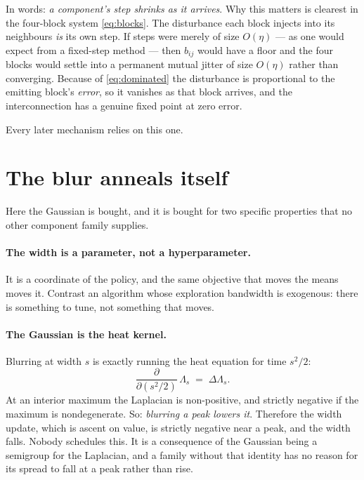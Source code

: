 \documentclass[11pt]{article}
\theoremstyle{definition}
\begin{document}
In words: \emph{a component's step shrinks as it arrives}. Why this matters is
clearest in the four-block system \eqref{eq:blocks}. The disturbance each block
injects into its neighbours \emph{is} its own step. If steps were merely of size
$O(\eta)$ --- as one would expect from a fixed-step method --- then $b_{ij}$ would
have a floor and the four blocks would settle into a permanent mutual jitter of
size $O(\eta)$ rather than converging. Because of \eqref{eq:dominated} the
disturbance is proportional to the emitting block's \emph{error}, so it vanishes
as that block arrives, and the interconnection has a genuine fixed point at zero
error.

Every later mechanism relies on this one.

\section{The blur anneals itself}\label{sec:anneal}

Here the Gaussian is bought, and it is bought for two specific properties that no
other component family supplies.

\paragraph{The width is a parameter, not a hyperparameter.} It is a coordinate of
the policy, and the same objective that moves the means moves it. Contrast an
algorithm whose exploration bandwidth is exogenous: there is something to tune,
not something that moves.

\paragraph{The Gaussian is the heat kernel.} Blurring at width $s$ is exactly
running the heat equation for time $s^2/2$:
\begin{equation}\label{eq:heat}
  \frac{\partial}{\partial (s^2/2)}\, \Lambda_s \;=\; \Delta \Lambda_s .
\end{equation}
At an interior maximum the Laplacian is non-positive, and strictly negative if
the maximum is nondegenerate. So: \emph{blurring a peak lowers it}. Therefore the
width update, which is ascent on value, is strictly negative near a peak, and the
width falls. Nobody schedules this. It is a consequence of the Gaussian being a
semigroup for the Laplacian, and a family without that identity has no reason for
its spread to fall at a peak rather than rise.
\end{document}
